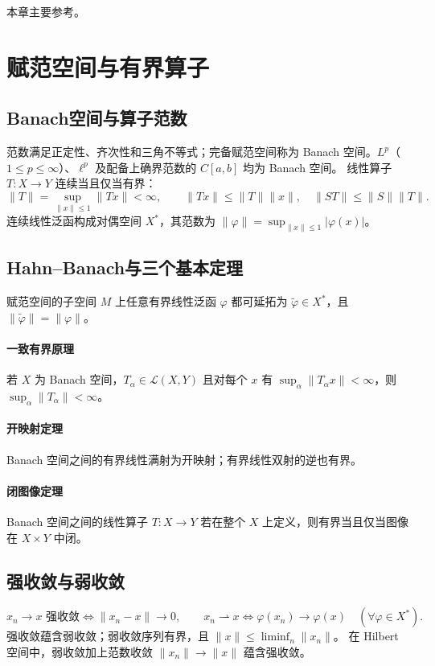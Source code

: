 \documentclass[../main.tex]{subfiles}
\begin{document}
本章主要参考\cite{brezis}。

\section{赋范空间与有界算子}
\subsection{Banach空间与算子范数}
范数满足正定性、齐次性和三角不等式；完备赋范空间称为 Banach 空间。$L^p$（$1\le p\le\infty$）、$\ell^p$ 及配备上确界范数的 $C[a,b]$ 均为 Banach 空间。
线性算子 $T:X\to Y$ 连续当且仅当有界：
\[
\|T\|=\sup_{\|x\|\le1}\|Tx\|<\infty,\qquad
\|Tx\|\le\|T\|\|x\|,\quad\|ST\|\le\|S\|\|T\|.
\]
连续线性泛函构成对偶空间 $X^*$，其范数为 $\|\varphi\|=\sup_{\|x\|\le1}|\varphi(x)|$。
\subsection{Hahn--Banach与三个基本定理}
赋范空间的子空间 $M$ 上任意有界线性泛函 $\varphi$ 都可延拓为 $\widetilde\varphi\in X^*$，且 $\|\widetilde\varphi\|=\|\varphi\|$。
\paragraph{一致有界原理} 若 $X$ 为 Banach 空间，$T_\alpha\in\mathcal L(X,Y)$ 且对每个 $x$ 有 $\sup_\alpha\|T_\alpha x\|<\infty$，则 $\sup_\alpha\|T_\alpha\|<\infty$。
\paragraph{开映射定理} Banach 空间之间的有界线性满射为开映射；有界线性双射的逆也有界。
\paragraph{闭图像定理} Banach 空间之间的线性算子 $T:X\to Y$ 若在整个 $X$ 上定义，则有界当且仅当图像在 $X\times Y$ 中闭。
\subsection{强收敛与弱收敛}
\[
x_n\to x\text{ 强收敛}\iff\|x_n-x\|\to0,\qquad
x_n\rightharpoonup x\iff\varphi(x_n)\to\varphi(x)\quad(\forall\varphi\in X^*).
\]
强收敛蕴含弱收敛；弱收敛序列有界，且 $\|x\|\le\liminf_n\|x_n\|$。
在 Hilbert 空间中，弱收敛加上范数收敛 $\|x_n\|\to\|x\|$ 蕴含强收敛。
\end{document}
